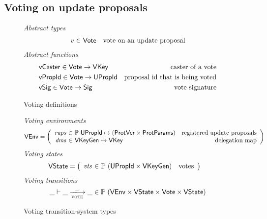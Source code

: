 \clearpage

\subsection{Voting on update proposals}
\label{sec:voting-on-update-proposals}

\begin{figure}[htb]
  \emph{Abstract types}
  \begin{equation*}
    \begin{array}{r@{~\in~}lr}
      \var{v} & \Vote & \text{vote on an update proposal}
    \end{array}
  \end{equation*}
  \emph{Abstract functions}
  \begin{align*}
    & \mathsf{vCaster} \in \mathsf{Vote} \to \mathsf{VKey} & \text{caster of a vote}\\
    & \mathsf{vPropId} \in \mathsf{Vote} \to \mathsf{UPropId} & \text{proposal id that is being voted}\\
    & \mathsf{vSig} \in \mathsf{Vote} \to \mathsf{Sig} & \text{vote signature}
  \end{align*}
  \caption{Voting definitions}
  \label{fig:defs:voting}
\end{figure}

\begin{figure}[htb]
  \emph{Voting environments}
  \begin{align*}
    & \VEnv
      = \left(
      \begin{array}{r@{~\in~}lr}
        \var{rups} & \powerset{\UPropId \mapsto (\ProtVer \times \ProtParams)}
        & \text{registered update proposals}\\
        \var{dms} & \VKeyGen \mapsto \VKey & \text{delegation map}
      \end{array}\right)
  \end{align*}
  \emph{Voting states}
  \begin{align*}
    & \VState
      = \left(
      \begin{array}{r@{~\in~}lr}
        \var{vts} & \powerset{(\UPropId \times \VKeyGen)} & \text{votes}
      \end{array}\right)
  \end{align*}
  \emph{Voting transitions}
    \begin{equation*}
    \_ \vdash \_ \trans{vote}{\_} \_ \in
    \powerset (\VEnv \times \VState \times \Vote \times \VState)
    \end{equation*}
  \caption{Voting transition-system types}
  \label{fig:ts-types:voting}
\end{figure}

